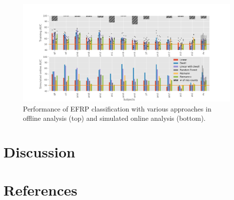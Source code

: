 \documentclass[12pt]{iopart}
\begin{document}
\begin{figure}[!t]
    \includegraphics[trim={2cm 0cm 2cm 0cm},clip,width=1.1\columnwidth]{../images/ClassificationAll.png}
    \caption{Performance of EFRP classification with various approaches in offline analysis (top)
    and simulated online analysis (bottom).}
\label{fig:classAll}
\end{figure}





\section{Discussion}
\label{sec:discussion}


\section*{References}



\end{document}

